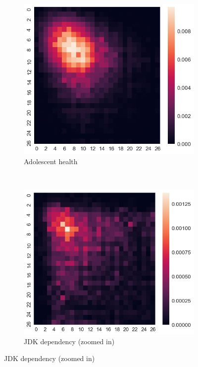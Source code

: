 \bigskip
\begin{figure}[h]
    \centering
    \begin{subfigure}[b]{0.3\textwidth}
        \includegraphics[width=\textwidth]{img/heatmap_0}
        \caption*{Adolescent health}
    \end{subfigure}
    ~
    \begin{subfigure}[b]{0.3\textwidth}
        \includegraphics[width=\textwidth]{img/heatmap_1}
        \caption*{JDK dependency (zoomed in)}

\end{subfigure}
\end{figure}
